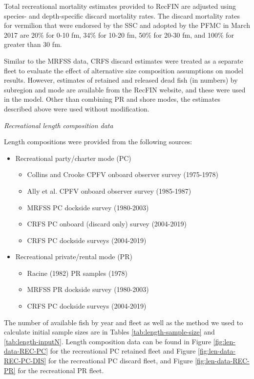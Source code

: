 \documentclass[11pt,
  english,
  a4paper,
]{article}
\begin{document}
Total recreational mortality estimates provided to RecFIN are adjusted using species- and depth-specific discard mortality rates. The discard mortality rates for vermilion that were endorsed by the SSC and adopted by the PFMC in March 2017 are 20\% for 0-10 fm, 34\% for 10-20 fm, 50\% for 20-30 fm, and 100\% for greater than 30 fm.

Similar to the MRFSS data, CRFS discard estimates were treated as a separate fleet to evaluate the effect of alternative size composition assumptions on model results. However, estimates of retained and released dead fish (in numbers) by subregion and mode are available from the RecFIN website, and these were used in the model. Other than combining PR and shore modes, the estimates described above were used without modification.

\emph{Recreational length composition data}

Length compositions were provided from the following sources:

\begin{itemize}
 \item Recreational party/charter mode (PC)
   \begin{itemize}
    \item Collins and Crooke CPFV onboard observer survey (1975-1978)  
    \item Ally  et al. CPFV onboard observer survey (1985-1987)
    \item MRFSS PC dockside survey (1980-2003)     
    \item CRFS PC onboard (discard only) survey (2004-2019)
    \item CRFS PC dockside surveys (2004-2019)
  \end{itemize}
 \item Recreational private/rental mode (PR)
   \begin{itemize}
    \item Racine (1982) PR samples (1978)
    \item MRFSS PR dockside survey (1980-2003) 
    \item CRFS PC dockside surveys (2004-2019)
   \end{itemize}
\end{itemize}

The number of available fish by year and fleet as well as the method we used to calculate initial sample sizes are in Tables \ref{tab:length-sample-size} and \ref{tab:length-inputN}. Length composition data can be found in Figure \ref{fig:len-data-REC-PC} for the recreational PC retained fleet and Figure \ref{fig:len-data-REC-PC-DIS} for the recreational PC discard fleet, and Figure \ref{fig:len-data-REC-PR} for the recreational PR fleet.
\end{document}
